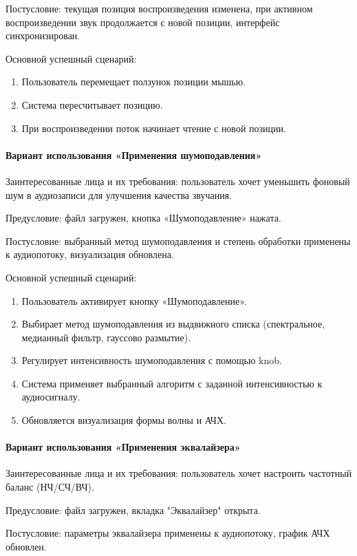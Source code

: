 Постусловие: текущая позиция воспроизведения изменена, при активном воспроизведении звук продолжается с новой позиции, интерфейс синхронизирован.

Основной успешный сценарий:
\begin{enumerate}
	\item Пользователь перемещает ползунок позиции мышью.
	\item Система пересчитывает позицию.
	\item При воспроизведении поток начинает чтение с новой позиции.
\end{enumerate}

\paragraph{Вариант использования «Применения шумоподавления»}

Заинтересованные лица и их требования: пользователь хочет уменьшить фоновый шум в аудиозаписи для улучшения качества звучания.

Предусловие: файл загружен, кнопка «Шумоподавление» нажата.

Постусловие: выбранный метод шумоподавления и степень обработки применены к аудиопотоку, визуализация обновлена.

Основной успешный сценарий:
\begin{enumerate}
	\item Пользователь активирует кнопку «Шумоподавление».
	\item Выбирает метод шумоподавления из выдвижного списка (спектральное, медианный фильтр, гауссово размытие).
	\item Регулирует интенсивность шумоподавления с помощью knob.
	\item Система применяет выбранный алгоритм с заданной интенсивностью к аудиосигналу.
	\item Обновляется визуализация формы волны и АЧХ.
\end{enumerate}

\paragraph{Вариант использования «Применения эквалайзера»}

Заинтересованные лица и их требования: пользователь хочет настроить частотный баланс (НЧ/СЧ/ВЧ).

Предусловие: файл загружен, вкладка "Эквалайзер" открыта.

Постусловие: параметры эквалайзера применены к аудиопотоку, график АЧХ обновлен.

